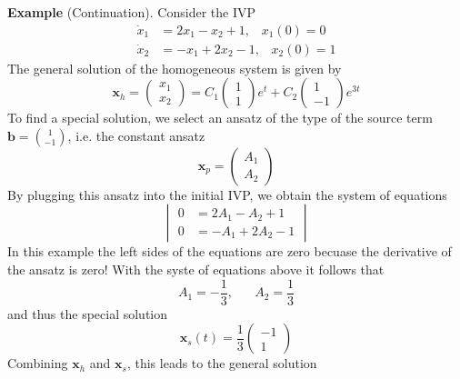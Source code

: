 \textbf{Example} (Continuation). Consider the IVP
\begin{equation}
  \begin{split}
    \dot{x}_1 &= 2x_1 - x_2 + 1, \;\;\; x_1(0) = 0\\
    \dot{x}_2 &= -x_1 + 2x_2 - 1, \;\;\; x_2(0) = 1
  \end{split}
\end{equation}
The general solution of the homogeneous system is given by
\begin{equation}
  \mathbf{x}_h = \begin{pmatrix} x_1 \\ x_2 \end{pmatrix} =
  C_1 \begin{pmatrix} 1 \\ 1 \end{pmatrix} e^t +
  C_2 \begin{pmatrix} 1 \\ -1\end{pmatrix} e^{3t}
\end{equation}
To find a special solution, we select an ansatz of the type of the source term $\mathbf{b} = \binom{1}{-1}$, i.e. the constant ansatz
\begin{equation}
  \mathbf{x}_p = \begin{pmatrix} A_1 \\ A_2 \end{pmatrix}
\end{equation}
By plugging this ansatz into the initial IVP, we obtain the system of equations
\begin{equation}
  \begin{vmatrix}
    0 &= 2A_1 - A_2 + 1\\
    0 &= -A_1 + 2A_2 - 1
  \end{vmatrix}
\end{equation}
In this example the left sides of the equations are zero becuase the derivative of the ansatz is zero! With the syste of equations above it follows that
\begin{equation}
  A_1 = -\frac{1}{3}, \;\;\;\;\;\; A_2 = \frac{1}{3}
\end{equation}
and thus the special solution
\begin{equation}
  \mathbf{x}_s(t) = \frac{1}{3} \begin{pmatrix} -1 \\ 1 \end{pmatrix}
\end{equation}
Combining $\mathbf{x}_h$ and $\mathbf{x}_s$, this leads to the general solution
